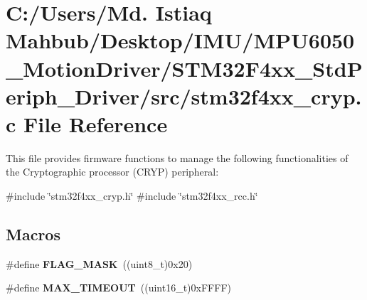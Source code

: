 \section{C\+:/\+Users/\+Md. Istiaq Mahbub/\+Desktop/\+I\+M\+U/\+M\+P\+U6050\+\_\+\+Motion\+Driver/\+S\+T\+M32\+F4xx\+\_\+\+Std\+Periph\+\_\+\+Driver/src/stm32f4xx\+\_\+cryp.c File Reference}
\label{stm32f4xx__cryp_8c}


This file provides firmware functions to manage the following functionalities of the Cryptographic processor (C\+R\+YP) peripheral\+:  


{\ttfamily \#include \char`\"{}stm32f4xx\+\_\+cryp.\+h\char`\"{}}\newline
{\ttfamily \#include \char`\"{}stm32f4xx\+\_\+rcc.\+h\char`\"{}}\newline
\subsection*{Macros}
\begin{DoxyCompactItemize}
\item 
\#define \textbf{ F\+L\+A\+G\+\_\+\+M\+A\+SK}~((uint8\+\_\+t)0x20)
\item 
\#define \textbf{ M\+A\+X\+\_\+\+T\+I\+M\+E\+O\+UT}~((uint16\+\_\+t)0x\+F\+F\+F\+F)
\end{DoxyCompactItemize}
